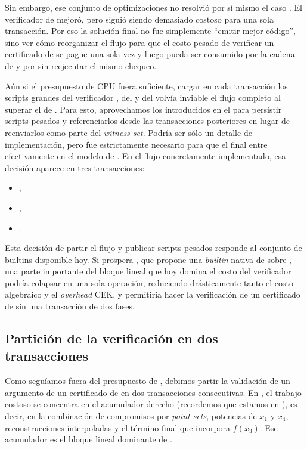 Sin embargo, ese conjunto de optimizaciones no resolvió por sí mismo el caso \MidnightSTMCircuit. El verificador de \Mithril mejoró, pero siguió siendo demasiado costoso para una sola transacción. Por eso la solución final no fue simplemente ``emitir mejor código'', sino ver cómo reorganizar el flujo para que el costo pesado de verificar un certificado de \Mithril se pague una sola vez y luego pueda ser consumido por la cadena de \StakeDistribution y por \MintTx sin reejecutar el mismo chequeo.

Aún si el presupuesto de CPU fuera suficiente, cargar en cada transacción los scripts grandes del verificador \STM, del \TxsUpdaterMintingValidator y del \MintingValidator volvía inviable el flujo completo al superar el \maxTxSize de \Cardano. Para esto, aprovechamos los \ReferenceScripts introducidos en el  \cite{CIP0033} para persistir scripts pesados \Onchain y referenciarlos desde las transacciones posteriores en lugar de reenviarlos como parte del \textit{witness set}. Podría ser sólo un detalle de implementación, pero fue estrictamente necesario para que el \zkBridge final entre efectivamente en el modelo \eUTxO de \Cardano. En el flujo concretamente implementado, esa decisión aparece en tres transacciones:
\begin{itemize}[noitemsep]
    \item \PublishPhaseOneReferenceScriptTx,
    \item \PublishMintingTxsUpdaterSpendReferenceScriptTx,
    \item \PublishBridgeMintingReferenceScriptTx.
\end{itemize}

Esta decisión de partir el flujo y publicar scripts pesados responde al conjunto de builtins disponible hoy. Si prospera , que propone una \textit{builtin} nativa de \MSM sobre \BLS \cite{CIP0133, PlutusMSMBenchRepo}, una parte importante del bloque lineal que hoy domina el costo del verificador podría colapsar en una sola operación, reduciendo drásticamente tanto el costo algebraico y el \textit{overhead} CEK, y permitiría hacer la verificación de un certificado de \Mithril sin una transacción de dos fases.

\subsection{Partición de la verificación en dos transacciones}

Como seguíamos fuera del presupuesto de \maxTxExUnits, debimos partir la validación de un argumento \STM de un certificado de \Mithril en dos transacciones consecutivas. En \MidnightSTMCircuit, el trabajo costoso se concentra en el acumulador derecho (recordemos que estamos en \HaloTwoMultiOpen), es decir, en la combinación de compromisos por \textit{point sets}, potencias de $x_1$ y $x_4$, reconstrucciones interpoladas y el término final que incorpora $f(x_3)$. Ese acumulador es el bloque lineal dominante de \ExUnits.

